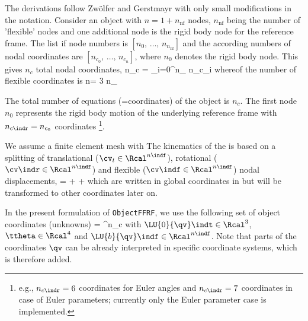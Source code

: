      \rowTable{transformation of flexible coordinates}{$\LU{0b}{\Am_{bd}} = \mathrm{diag}([\LU{0b}{\Am},\;\ldots,\;\LU{0b}{\Am})$}{block diagonal transformation matrix, which transforms all flexible coordinates from local to global coordinates}
    \finishTable
    The derivations follow Zw{\"o}lfer and Gerstmayr \cite{ZwoelferGerstmayr2021} with only small modifications in the notation.
    Consider an object with $n = 1 + n_\mathrm{nf}$ nodes, $n_\mathrm{nf}$ being the number of 'flexible' nodes and one additional node is the rigid body node for the reference frame.
    The list if node numbers is $[n_0,\,\ldots,\,n_{n_\mathrm{nf}}]$ and the according numbers of 
    nodal coordinates are $[n_{c_0},\,\ldots,\,n_{c_n}]$, where $n_0$ denotes the rigid body node.
    This gives $n_c$ total nodal coordinates, 
    \be
    	n_c = \sum_{i=0}^{n_} n_{c_i} \eqComma
    \ee
    whereof the number of flexible coordinates is
    \be
    	n\indf = 3 \cdot n_ \eqDot
    \ee
    
    \noindent The total number of equations (=coordinates) of the object is $n_c$.
    The first node $n_0$ represents the rigid body motion of the underlying reference frame with $n_{c\indr} = n_{c_0}$ coordinates 
    \footnote{e.g., $n_{c\indr}=6$ coordinates for Euler angles and $n_{c\indr}=7$ coordinates in case of Euler parameters; currently only the Euler parameter
    case is implemented.}. 
    
    We assume a finite element mesh with 
    The kinematics of the  is based on a splitting of 
    translational ($\cv_t \in \Rcal^{n\indf}$), rotational ($\cv\indr \in \Rcal^{n\indf}$) and flexible ($\cv\indf \in \Rcal^{n\indf}$) nodal displacements, 
    \be \label{eq:ObjectFFRF:coordinatesSplitting}
       =  +  +  \eqDot
    \ee
    which are written in global coordinates in  but will be transformed to other coordinates later on.
    
    In the present formulation of \texttt{ObjectFFRF}, we use the following set of object coordinates (unknowns)
    \be
      \qv = \tp \in \Rcal^{n_c}
    \ee
    with $\LU{0}{\qv}\indt \in \Rcal^{3}$, $\ttheta \in \Rcal^{4}$ and $\LU{b}{\qv}\indf \in \Rcal^{n\indf}$.
    Note that parts of the coordinates $\qv$ can be already interpreted in specific coordinate systems, which is therefore added.
    
